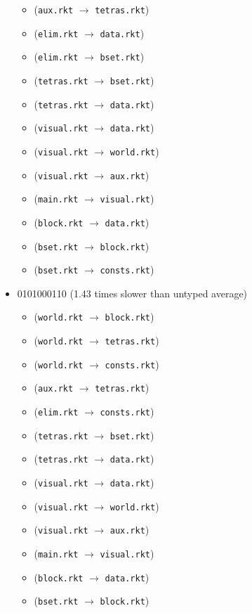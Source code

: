 \documentclass{article}
\newcommand{\mono}[1]{\texttt{#1}}
\begin{document}
\begin{itemize}
\begin{itemize}
  \item (\mono{aux.rkt} $\rightarrow$ \mono{tetras.rkt})
  \item (\mono{elim.rkt} $\rightarrow$ \mono{data.rkt})
  \item (\mono{elim.rkt} $\rightarrow$ \mono{bset.rkt})
  \item (\mono{tetras.rkt} $\rightarrow$ \mono{bset.rkt})
  \item (\mono{tetras.rkt} $\rightarrow$ \mono{data.rkt})
  \item (\mono{visual.rkt} $\rightarrow$ \mono{data.rkt})
  \item (\mono{visual.rkt} $\rightarrow$ \mono{world.rkt})
  \item (\mono{visual.rkt} $\rightarrow$ \mono{aux.rkt})
  \item (\mono{main.rkt} $\rightarrow$ \mono{visual.rkt})
  \item (\mono{block.rkt} $\rightarrow$ \mono{data.rkt})
  \item (\mono{bset.rkt} $\rightarrow$ \mono{block.rkt})
  \item (\mono{bset.rkt} $\rightarrow$ \mono{consts.rkt})
  \end{itemize}
\item 0101000110 (1.43 times slower than untyped average)
  \begin{itemize}
  \item (\mono{world.rkt} $\rightarrow$ \mono{block.rkt})
  \item (\mono{world.rkt} $\rightarrow$ \mono{tetras.rkt})
  \item (\mono{world.rkt} $\rightarrow$ \mono{consts.rkt})
  \item (\mono{aux.rkt} $\rightarrow$ \mono{tetras.rkt})
  \item (\mono{elim.rkt} $\rightarrow$ \mono{consts.rkt})
  \item (\mono{tetras.rkt} $\rightarrow$ \mono{bset.rkt})
  \item (\mono{tetras.rkt} $\rightarrow$ \mono{data.rkt})
  \item (\mono{visual.rkt} $\rightarrow$ \mono{data.rkt})
  \item (\mono{visual.rkt} $\rightarrow$ \mono{world.rkt})
  \item (\mono{visual.rkt} $\rightarrow$ \mono{aux.rkt})
  \item (\mono{main.rkt} $\rightarrow$ \mono{visual.rkt})
  \item (\mono{block.rkt} $\rightarrow$ \mono{data.rkt})
  \item (\mono{bset.rkt} $\rightarrow$ \mono{block.rkt})

\end{itemize}
\end{itemize}
\end{document}
